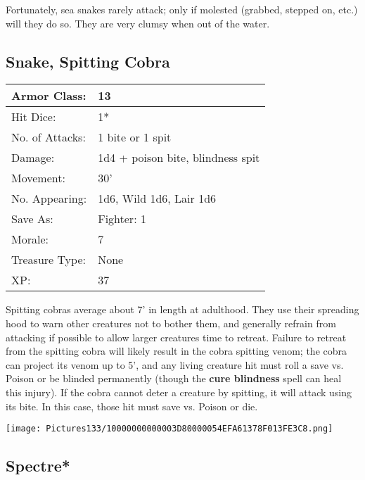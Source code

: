 \documentclass[a4paper,twoside,openany,10pt]{book}
\begin{document}
\begin{multicols}{2}
Fortunately, sea snakes rarely attack; only if molested (grabbed, stepped on, etc.) will they do so. They are very clumsy when out of the water.

\subsection*{Snake, Spitting Cobra}\label{snake-spitting-cobra}

\begin{tabularx}{0.50\textwidth}{@{}lX@{}}
Armor Class: & 13 \\\hline
Hit Dice: & 1* \\\hline
No. of Attacks: & 1 bite or 1 spit \\\hline
Damage: & 1d4 + poison bite, blindness spit \\\hline
Movement: & 30' \\\hline
No. Appearing: & 1d6, Wild 1d6, Lair 1d6 \\\hline
Save As: & Fighter: 1 \\\hline
Morale: & 7 \\\hline
Treasure Type: & None \\\hline
XP: & 37 \\\hline
\end{tabularx}\medskip

Spitting cobras average about 7' in length at adulthood. They use their spreading hood to warn other creatures not to bother them, and generally refrain from attacking if possible to allow larger creatures time to retreat. Failure to retreat from the spitting cobra will likely result in the cobra spitting venom; the cobra can project its venom up to 5', and any living creature hit must roll a save vs. Poison or be blinded permanently (though the \textbf{cure blindness} spell can heal this injury). If the cobra cannot deter a creature by spitting, it will attack using its bite. In this case, those hit must save vs. Poison or die.

\vfill

\begin{center} \texttt{[image: Pictures133/10000000000003D80000054EFA61378F013FE3C8.png]} \end{center}

\columnbreak


\subsection*{Spectre*}\label{spectre}


\end{multicols}
\end{document}
